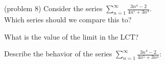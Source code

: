 \documentclass[handout]{ximera}
\begin{document}
\begin{problem}(problem 8)
Consider the series $\displaystyle{\sum_{n=1}^\infty \frac{3n^4 -2}{4n^5 + 3n^4}}$.\\
Which series should we compare this to?

\begin{multipleChoice}
\end{multipleChoice}

What is the value of the limit in the LCT?
\begin{multipleChoice}
\end{multipleChoice}

Describe the behavior of the series $\displaystyle{\sum_{n=1}^\infty \frac{3n^4 -2}{4n^5 + 3n^4}:}$
\begin{multipleChoice}
\end{multipleChoice}

\end{problem}
\end{document}
